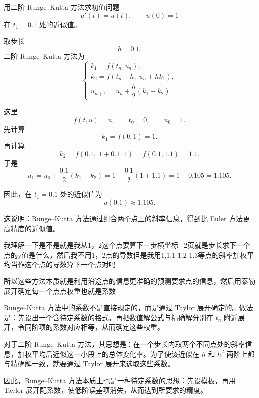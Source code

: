 \begin{example}
用二阶 Runge--Kutta 方法求初值问题
\[
u'(t)=u(t),\qquad u(0)=1
\]
在 \(t_1=0.1\) 处的近似值。

取步长
\[
h=0.1.
\]
二阶 Runge--Kutta 方法为
\[
\begin{cases}
k_1=f(t_n,u_n),\\
k_2=f(t_n+h,\;u_n+h k_1),\\
u_{n+1}=u_n+\dfrac{h}{2}(k_1+k_2).
\end{cases}
\]

这里
\[
f(t,u)=u,\qquad t_0=0,\qquad u_0=1.
\]
先计算
\[
k_1=f(0,1)=1.
\]
再计算
\[
k_2=f(0.1,\;1+0.1\cdot 1)=f(0.1,1.1)=1.1.
\]
于是
\[
u_1=u_0+\frac{0.1}{2}(k_1+k_2)
=1+\frac{0.1}{2}(1+1.1)
=1+0.105
=1.105.
\]

因此，在 \(t_1=0.1\) 处的近似值为
\[
u(0.1)\approx 1.105.
\]

这说明：Runge--Kutta 方法通过组合两个点上的斜率信息，得到比 Euler 方法更高精度的近似值。
\end{example}
\begin{dxtips}[记住这个是二元函数两个变量]
    我理解一下是不是就是我从1，2这个点要算下一步横坐标+2页就是步长求下一个点的y值是什么，然后我不用1，2点的导数但是我用1,1.1 1.2 1.3等点的斜率加权平均当作这个点的导数算下一个点对吗
\end{dxtips}
\begin{dxtips}
    所以这些方法本质就是利用沿途点的信息更准确的预测要求点的信息，然后用泰勒展开确定每一个点点权重也就是系数
\end{dxtips}
\begin{note}
Runge--Kutta 方法中的系数不是直接规定的，而是通过 Taylor 展开确定的。做法是：先设出一个含待定系数的格式，再把数值解公式与精确解分别在 \(t_n\) 附近展开，令同阶项的系数对应相等，从而确定这些权重。

对于二阶 Runge--Kutta 方法，其思想是：在一个步长内取两个不同点处的斜率信息，加权平均后近似这一小段上的总体变化率。为了使该近似在 \(h\) 和 \(h^2\) 两阶上都与精确解一致，就要通过 Taylor 展开来选取这些系数。

因此，Runge--Kutta 方法本质上也是一种待定系数的思想：先设模板，再用 Taylor 展开配系数，使低阶误差项消失，从而达到所要求的精度。
\end{note}